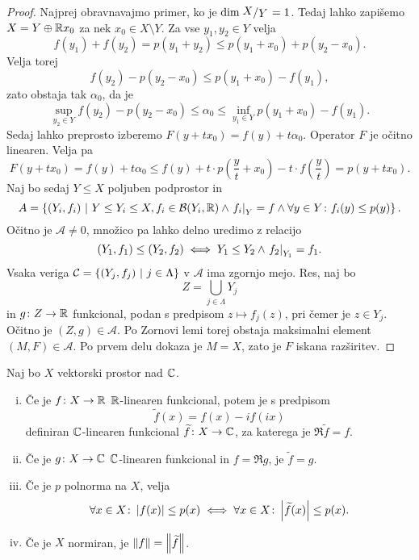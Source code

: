 \begin{proof}
Najprej obravnavajmo primer, ko je $\dim \kvoc{X}{Y} = 1$. Tedaj
lahko zapišemo $X = Y \oplus \mathbb{R} x_0$ za nek
$x_0 \in X \setminus Y$. Za vse $y_1, y_2 \in Y$ velja
\[
f(y_1) + f(y_2) = p(y_1 + y_2) \leq p(y_1 + x_0) + p(y_2 - x_0).
\]
Velja torej
\[
f(y_2) - p(y_2 - x_0) \leq p(y_1 + x_0) - f(y_1),
\]
zato obstaja tak $\alpha_0$, da je
\[
\sup_{y_2 \in Y} f(y_2) - p(y_2 - x_0) \leq
\alpha_0 \leq
\inf_{y_1 \in Y} p(y_1 + x_0) - f(y_1).
\]
Sedaj lahko preprosto izberemo $F(y + tx_0) = f(y) + t\alpha_0$.
Operator $F$ je očitno linearen. Velja pa
\[
F(y + tx_0) = f(y) + t\alpha_0 \leq
f(y) + t \cdot p\left(\frac{y}{t} + x_0\right) -
t \cdot f\left(\frac{y}{t}\right) = p(y + t x_0).
\]
Naj bo sedaj $Y \leq X$ poljuben podprostor in
\[
A = \left\{(Y_i, f_i)~\middle\vert~Y \leq Y_i \leq X,
f_i \in \mathcal{B}(Y_i, \mathbb{R}) \land \left. f_i\right|_{Y}^{} = f \land
\forall y \in Y \colon f_i(y) \leq p(y)\right\}.
\]
Očitno je $\mathcal{A} \ne 0$, množico pa lahko delno uredimo z
relacijo
\[
(Y_1, f_1) \leq (Y_2, f_2) \iff
Y_1 \leq Y_2 \land \left. f_2\right|_{Y_1}^{} = f_1.
\]
Vsaka veriga $\mathcal{C} = \left\{(Y_j, f_j)~\middle\vert~j \in \Lambda\right\}$ v
$\mathcal{A}$ ima zgornjo mejo. Res, naj bo
\[
Z = \bigcup_{j \in \Lambda} Y_j
\]
in $g \colon Z \to \mathbb{R}$ funkcional, podan s predpisom
$z \mapsto f_j(z)$, pri čemer je $z \in Y_j$. Očitno je
$(Z, g) \in \mathcal{A}$. Po Zornovi lemi torej obstaja maksimalni
element $(M, F) \in \mathcal{A}$. Po prvem delu dokaza je $M = X$,
zato je $F$ iskana razširitev.
\end{proof}

\begin{lema}\label{lm:hb:1}
Naj bo $X$ vektorski prostor nad $\mathbb{C}$.

\begin{enumerate}[i)]
\item Če je $f \colon X \to \mathbb{R}$ $\mathbb{R}$-linearen funkcional, potem je
s predpisom
\[
\widetilde{f}(x) = f(x) - if(ix)
\]
definiran $\mathbb{C}$-linearen funkcional $\widetilde{f} \colon X \to \mathbb{C}$,
za katerega je $\Re \widetilde{f} = f$.
\item Če je $g \colon X \to \mathbb{C}$ $\mathbb{C}$-linearen funkcional in
$f = \Re g$, je $\widetilde{f} = g$.
\item Če je $p$ polnorma na $X$, velja
\[
\forall x \in X \colon \left\lvert f(x)\right\rvert \leq p(x) \iff
\forall x \in X \colon \left\lvert \widetilde{f}(x)\right\rvert \leq p(x).
\]
\item Če je $X$ normiran, je $\left\lVert f\right\rVert = \left\lVert \widetilde{f}\right\rVert$.
\end{enumerate}
\end{lema}

